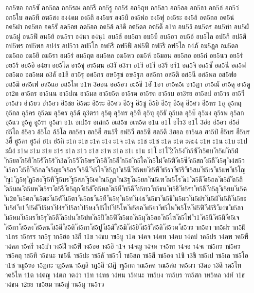 {อก5ซอ
อก5ซั
อก5ถล
อก5รณ
อก5รี
อก5รู
อก5ร่
อก5ฤท
อก5ลว
อก5ลอ
อก5ลา
อก5ล่
อก5ว่
อก5ใบ
อค5ที
อฆ5สง
อง4คม
อง5ถิ
อง5บร
อง5บิ
อง5ฟอ
อง5ฟุ
อง5ระ
อง5อ้
อด5ถอ
อด5น่
อด5ฝา
อด5ยอ
อด5รั
อด5อย
อด5ออ
อด5อ้
อ3ดิ
อต5ดอ
อต5ด็
อ1ท
อน5ง้
อน5ดร
อน5ทำ
อน5ผั
อน5ฝู
อน5ฟิ
อน5ย้
อน5รา
อ4นา
อ4นุ1
อบ5ช้
อบ5ถา
อบ5บี
อบ5อว
อบ5อ้
อบ5ไล
อป5กิ
อป5ติ
อป5พร
อป5พล
อป4ร
อป5วา
อป5โล
อพ5ริ
อฟ5ฟิ
อฟ5ฟี
อฟ5ริ
อฟ5ไล
อ4ภั
อม5ฎอ
อม5ดอ
อม5ถอ
อม5ยิ
อม5รา
อม5ร่
อม5ฤต
อม5หล
อม5หว
อม5ห้
อ5มอน
อย5กอ
อย5ก๋
อย5นว
อย5ร่
อย5ร้
อย5อิ
อ4ยา
อย5ได
อร5ชุ
อร5มน
อ3รั
อ3รา
อ1ริ
อ1รี
อ3ร้
อร์1
อล5จี
อล5ซั
อล5นี
อล5ฟ่
อล5มอ
อล5หม
อ3ลั
อ1ลิ
อว5รุ
อศ5กร
อษ5ฐช
อษ5ฐภ
อส5กา
อส5ติ
อส5นี
อส5พล
อส5ฟอ
อส5มิ
อส5เฟ
อส5แอ
อส5ไพ
อ1ห
3ออน
ออ5อว
อะ5ธี
1อั
1อา
อา5ค5เ
อา5ฏา
อา5ณั
อา5ดุ
อา5ดู
อา2ต
อา5ถร
อา5นน
อา5ปณ
อา5มล
อา5ย5ต
อา5รด
อา5รต
อา5รบ
อา3รย
อา5ลป
อา5วร
อา5วี
อา5สว
อำ5ยว
อำ5อว
อิ5ชย
อิ5ดะ
อิ5ระ
อิ5ศว
อี5จู
อี5ซู
อี5ยิ
อี5รุ
อี5ลุ
อี5ศว
อี5หร
1อุ
อุ5กฤ
อุ5กล
อุ5คร
อุ5ดม
อุ5ดร
อุ5ด้
อุ3ตรา
อุ5ตุ
อุ5ทร
อุ5ทิ
อุ5ทุ
อุ5ธั
อุ5บล
อุ5บ๊
อุ5มง
อุ5รพ
อุ5ลก
อุ5แว
อู5คู
อู5รา
อู5ลา
อ1เ
อเป5ร
อเสก5
อเส5ข
อเห5ต
อ1แ
อ1โ
อโร3
อ1ไ
3อ่อ
อ่5อว
อ่5อ่
อ่5โถ
อ้5อว
อ้5โถ
อ้5โล
ฮก5ฮา
ฮก5ฮื
ฮน5รี
ฮฟ5วี
ฮล5ซิ
ฮล5ดิ
3ฮอล
ฮา5นอ
ฮา5ป่
ฮิ5บร
ฮี5บร
3ฮื้
ฮู5ลา
ฮู5ล่
ฮ1เ
ฮ่5กึ
ะ1ก
ะ1ข
ะ1ค
ะ1ง
ะ1จ
ะ1ฉ
ะ1ช
ะ1ซ
ะ1ด
ะ1ต
ะตะ4
ะ1ท
ะ1น
ะ1บ
ะ1ป
ะผี4
ะ1พ
ะ1ม
ะ1ย
ะ1ร
ะ1ล
ะ1ว
ะ1ส
ะ1ห
ะ1อ
ะ1เ
ะ1แ
ะ1โ
ะ1ไ
ั2
ัก5ง่
ัก5ซ้
ัก5ตบ
ัก5ผ่
ัก5ฝ่
ัก5ยอ
ัก5ยิ
ัก5รั
ัก5ร้
ัก3ล
ัก5วิ
ัก5ษร
ัก5อิ
ัก5อี
ัก5อ่
ัก5ใค
ัก5ใฝ
ัค5ฆิ
ัค5ซี
ัค5สถ
ัง5ถึ
ัง5ศุ
ัง4ส5ว
ัง5อว
ัง5ฮี
ัจ5กล
ัจ5ญะ
ัจ5ถร
ัจ5นึ
ัจ5โจ
ัช5ฎา
ัช5นี
ัช5พย
ัช5พื
ัช5รา
ัช5ริ
ัช5สม
ัช5เร
ัช5แพ
ัช5โญ
ัญ1
ัฏ5ทุ
ัฏ5สง
ัฐ5ทิ
ัฐ5บร
ัฐ5สภ
ัฐ5เค
ัณ5ฏก
ัณ3ฐ
ัณ5ยก
ัณ5เฑ
ัณ5โร
ัด1
ัต5ดึ
ัต5ถล
ัต5ถั
ัต5ถิ
ัต5มณ
ัต5มห
ัต5รา
ัต5รี
ัต5ฤก
ัต5ลั
ัต5หล
ัต5หี
ัท5คี
ัท5ทว
ัท5ธน
ัท5ธิ
ัท5รา
ัท5ลี
ัท5ลุ
ัธ5ยม
ัน5ฉ่
ัน2ต
ัน5ตภ
ัน5ตะ
ัน5ตั
ัน5ตา
ัน5ถธ
ัน5ทึ
ัน5ทุ
ัน5ท่
ัน4ธ
ัน5ธา
ัน5ธิ
ัน5ผว
ัน5ฝร
ัน5ฝ่
ัน5ภิ
ัน5ยะ
ัน5ย่
ับ1
ัป5คั
ัป5ผา
ัป4ร
ัป5ลา
ัป5หง
ัป5โป
ัป5โห
ัพ5ยอ
ัพ5ยา
ัพ5โพ
ัพ5โห
ัฟ5ฟิ
ัฟ5ริ
ัม4ช
ัม5ลา
ัม5หม
ัย5มร
ัย5รุ
ัล5ดี
ัล5ปน
ัล5ปพ
ัล5ปิ
ัล5ฟิ
ัล5มอ
ัล5มุ
ัล5ออ
ัล5ไซ
ัล5ไฟ
ัว1
ัศ5นี
ัศ5มี
ัศ5เจ
ัส5กา
ัส5ดง
ัส5ดน
ัส5ดี
ัส5ติ
ัส5ถา
ัส5ปู
ัส5มั
ัส5มิ
ัส5ยิ
ัส5รั
ัส5ลิ
ัส5วด
ัส5วร
าก5ถา
าก5ฝร
าก5ฝั
า1กร
า5กรร
าก5รุ
าก5ฮอ
า3กี
า1ข
า4ขบ
าข5บู
า1ค
า4คจ
า4คท
า4คบ
า4คป
าค5ปร
า4คพ
าค5พื
า4คภ
า5ครี
าง5บำ
าง5ฝี
าง5ฟิ
าง5ออ
าง5อิ
า1จ
า4จญ
า4จห
าจ5หา
า4จอ
า4จเ
าช5กร
าช5คร
าช5คฤ
าช5ทิ
า5ชนะ
าช5นี
าช5ปะ
าช5ลั
าช5วโ
าช5สก
าช5สี
าช5อง
า1ชิ
า3ชี
าช5เป
าช5เล
าช5โอ
า1ซ
าญ5รอ
า5ฏกะ
าฏ5ดน
า5ฏลิ
าฏ5ลี
า3ฏิ
าฐ5กถ
าณ5คด
าณ5สถ
าด5ผว
า3ดอ
า3ดิ
าด5ไท
าด5ไห
า1ต
า4ตญ
า4ตภ
าต4ว
า1ท
า4ทธ
า4ทน
า5ทนะ
าท5บง
าท5บร
าท5สก
าท5หล
า4ท์
า1ธ
า4ธน
า2ธย
าธ5ยม
าน5ญ่
าน5ผู
าน5รว
}
